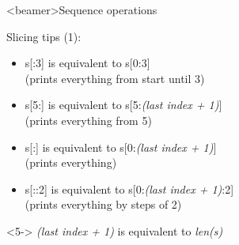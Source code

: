\begin{frame}<beamer>{Sequence operations}

  \begin{center}

  Slicing tips (1):

  \bigskip

  \begin{itemize}
    \item<1-> s[:3] is equivalent to s[0:3] \\
      { \footnotesize (prints everything from start until 3) } \\
    \item<2-> s[5:] is equivalent to s[5:{\footnotesize\textit{(last index + 1)}}] \\
      { \footnotesize (prints everything from 5) } \\
    \item<3-> s[:] is equivalent to s[0:{\footnotesize\textit{(last index + 1)}}] \\
      { \footnotesize (prints everything) } \\
    \item<4-> s[::2] is equivalent to s[0:{\footnotesize\textit{(last index + 1)}}:2] \\
      { \footnotesize (prints everything by steps of 2) } \\
  \end{itemize}

  \bigskip

  \begin{onlyenv}<5->
    \textit{(last index + 1)} is equivalent to \textit{len(s)} \\
  \end{onlyenv}

  \end{center}

\end{frame}




